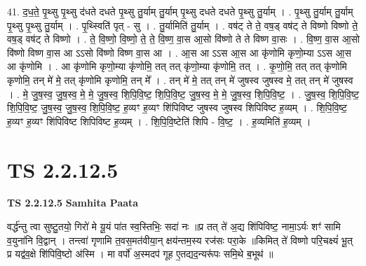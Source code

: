 \documentclass[17pt]{extarticle}
\begin{document}
41. द॒ध॒ते॒ पृ॒थ्सु पृ॒थ्सु द॑धते दधते पृ॒थ्सु तु॒र्याम् तु॒र्याम् पृ॒थ्सु दधते दधते पृ॒थ्सु तु॒र्याम् । . पृ॒थ्सु तु॒र्याम् तु॒र्याम् पृ॒थ्सु पृ॒थ्सु तु॒र्याम् । . पृ॒थ्स्विति॑ पृत् - सु । . तु॒र्यामिति॑ तु॒र्याम् । . वष॑ट् ते ते॒ वष॒ड् वष॑ट् ते विष्णो विष्णो ते॒ वष॒ड् वष॑ट् ते विष्णो । . ते॒ वि॒ष्णो॒ वि॒ष्णो॒ ते॒ ते॒ वि॒ष्ण॒ वा॒स आ॒सो वि॑ष्णो ते ते विष्ण वा॒सः । . वि॒ष्ण॒ वा॒स आ॒सो वि॑ष्णो विष्ण वा॒स आ ऽऽसो वि॑ष्णो विष्ण वा॒स आ । . आ॒स आ ऽऽस आ॒स आ कृ॑णोमि कृणो॒म्या ऽऽस आ॒स आ कृ॑णोमि । . आ कृ॑णोमि कृणो॒म्या कृ॑णोमि॒ तत् तत् कृ॑णो॒म्या कृ॑णोमि॒ तत् । . कृ॒णो॒मि॒ तत् तत् कृ॑णोमि कृणोमि॒ तन् मे॑ मे॒ तत् कृ॑णोमि कृणोमि॒ तन् मे᳚ । . तन् मे॑ मे॒ तत् तन् मे॑ जुषस्व जुषस्व मे॒ तत् तन् मे॑ जुषस्व । . मे॒ जु॒ष॒स्व॒ जु॒ष॒स्व॒ मे॒ मे॒ जु॒ष॒स्व॒ शि॒पि॒वि॒ष्ट॒ शि॒पि॒वि॒ष्ट॒ जु॒ष॒स्व॒ मे॒ मे॒ जु॒ष॒स्व॒ शि॒पि॒वि॒ष्ट॒ । . जु॒ष॒स्व॒ शि॒पि॒वि॒ष्ट॒ शि॒पि॒वि॒ष्ट॒ जु॒ष॒स्व॒ जु॒ष॒स्व॒ शि॒पि॒वि॒ष्ट॒ ह॒व्यꣳ ह॒व्यꣳ शि॑पिविष्ट जुषस्व जुषस्व शिपिविष्ट ह॒व्यम् । . शि॒पि॒वि॒ष्ट॒ ह॒व्यꣳ ह॒व्यꣳ शि॑पिविष्ट शिपिविष्ट ह॒व्यम् । . शि॒पि॒वि॒ष्टेति॑ शिपि - वि॒ष्ट॒ । . ह॒व्यमिति॑ ह॒व्यम् । \newline
\pagebreak
{}
\section*{ TS 2.2.12.5 }

\textbf{TS 2.2.12.5 } \newline
\textbf{Samhita Paata} \newline

वर्द्ध॑न्तु त्वा सुष्टु॒तयो॒ गिरो॑ मे यू॒यं पा॑त स्व॒स्तिभिः॒ सदा॑ नः ॥प्र तत् ते॑ अ॒द्य शि॑पिविष्ट॒ नामा॒ऽर्यः शꣳ॑ सामि व॒युना॑नि वि॒द्वान् । तन्त्वा॑ गृणामि त॒वस॒मत॑वीया॒न् क्षय॑न्तम॒स्य रज॑सः परा॒के ॥किमित् ते॑ विष्णो परि॒चक्ष्यं॑ भू॒त् प्र यद्व॑व॒क्षे शि॑पिवि॒ष्टो अ॑स्मि । मा वर्पो॑ अ॒स्मदप॑ गूह ए॒तद्यद॒न्यरू॑पः समि॒थे ब॒भूथ॑ ॥ \newline
\end{document}
